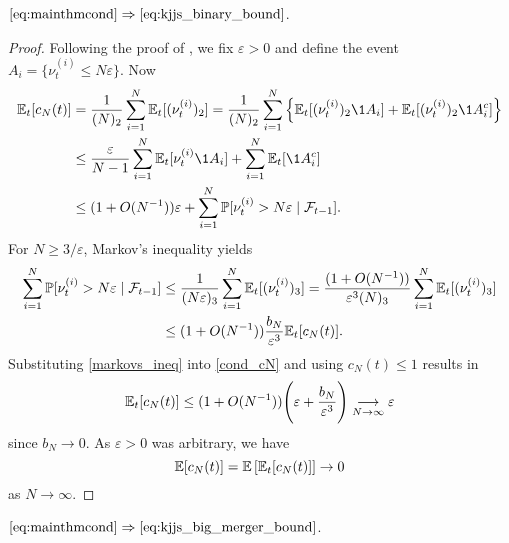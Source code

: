 \begin{lemma} \label{lem:removeass1}
$\eqref{eq:mainthmcond} \Rightarrow \eqref{eq:kjjs_binary_bound}$.
\end{lemma}

\begin{proof}
Following the proof of \textcite[Lemma 5.5]{mohle2003}, we fix $\varepsilon > 0$ and define the event $A_i = \{ \nu_t^{(i)} \leq N \varepsilon \}$.
Now
\begin{align}
\Et[ c_N( t ) ] 
&= \frac{ 1 }{ ( N )_2 } \sum_{ i = 1 }^N \Et[ ( \nu_t^{(i)} )_2] 
        = \frac{ 1 }{ ( N )_2 } \sum_{ i = 1 }^N \Big\{ \Et[ ( \nu_t^{(i)} )_2 \1{ A_i } ] 
        + \Et[ ( \nu_t^{(i)} )_2 \1{ A_i^c } ] \Big\} \notag \\
&\leq \frac{ \varepsilon }{ N - 1 } \sum_{ i = 1 }^N \Et[ \nu_t^{(i)} \1{ A_i }] 
        + \sum_{ i = 1 }^N \Et[\1{ A_i^c }] \notag \\
&\leq ( 1 + O( N^{ -1 } ) ) \varepsilon + \sum_{ i = 1 }^N 
        \Prob[ \nu_t^{(i)} > N \varepsilon \mid \mathcal{F}_{t-1}]. \label{cond_cN}
\end{align}
For $N \geq 3 / \varepsilon$, Markov's inequality yields
\begin{align}
\sum_{ i = 1 }^N \mathbb{P}[ \nu_t^{(i)} > N \varepsilon \mid \mathcal{F}_{t-1} ] 
&\leq \frac{ 1 }{ ( N \varepsilon )_3 } \sum_{ i = 1 }^N 
        \mathbb{E}_t[ ( \nu_t^{(i)} )_3] 
        = \frac{ ( 1 + O( N^{ -1 } ) ) }{ \varepsilon^3 ( N )_3 } 
        \sum_{ i = 1 }^N \mathbb{E}_t[ ( \nu_t^{(i)} )_3] \notag \\
&\leq ( 1 + O( N^{ -1 } ) ) \frac{ b_N }{ \varepsilon^3 } \mathbb{E}_t[ c_N( t )] . \label{markovs_ineq}
\end{align}
Substituting \eqref{markovs_ineq} into \eqref{cond_cN} and using $c_N( t ) \leq 1$ results in
\begin{equation*}
\mathbb{E}_t[ c_N( t )]
\leq ( 1 + O( N^{ -1 } ) ) 
        \Bigg( \varepsilon + \frac{ b_N }{ \varepsilon^3 } \Bigg) \underset{N\to\infty}{\longrightarrow} \varepsilon
\end{equation*}
since $b_N \rightarrow 0$. 
As $\varepsilon > 0$ was arbitrary, we have
\begin{equation*}
\mathbb{E}[ c_N( t ) ] 
= \mathbb{E}\left[ \mathbb{E}_t[ c_N( t ) ] \right] 
\rightarrow 0
\end{equation*}
as $N \rightarrow \infty$.
\end{proof}



\begin{lemma} \label{lem:removeass2}
$\eqref{eq:mainthmcond} \Rightarrow \eqref{eq:kjjs_big_merger_bound}$.
\end{lemma}

